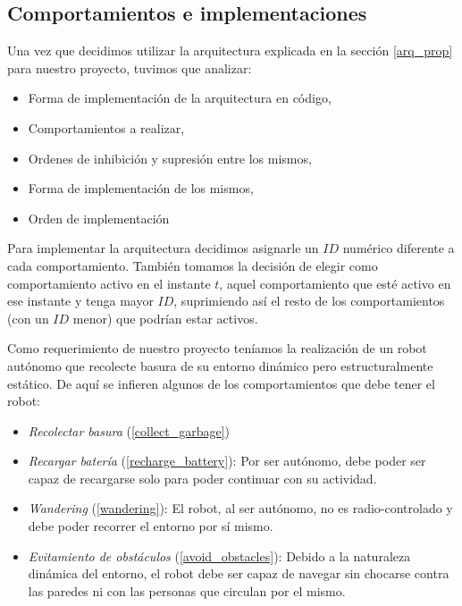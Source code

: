 
\subsection{Comportamientos e implementaciones}
\label{comportamientos}

Una vez que decidimos utilizar la arquitectura explicada en la secci\'on
\ref{arq_prop} para nuestro proyecto, tuvimos que analizar:
\begin{itemize}
\item{}Forma de implementaci\'on de la arquitectura en c\'odigo,
\item{}Comportamientos a realizar,
\item{}Ordenes de inhibici\'on y supresi\'on entre los mismos,
\item{}Forma de implementaci\'on de los mismos,
\item{}Orden de implementaci\'on
\end{itemize}

Para implementar la arquitectura decidimos asignarle un $ID$ num\'erico
diferente a cada comportamiento. Tambi\'en tomamos la decisi\'on de elegir como
comportamiento activo en el instante $t$, aquel comportamiento que est\'e
activo en ese instante y tenga mayor $ID$, suprimiendo as\'i el resto de los
comportamientos (con un $ID$ menor) que podr\'ian estar activos.

Como requerimiento de nuestro proyecto ten\'iamos la realizaci\'on de un robot
aut\'onomo que recolecte basura de su entorno din\'amico pero estructuralmente
est\'atico. De aqu\'i se infieren algunos de los comportamientos que debe tener
el robot:
\begin{itemize}
	\item{\emph{Recolectar basura} (\ref{collect_garbage})}
	\item{\emph{Recargar bater\'ia} (\ref{recharge_battery}):} Por ser
		aut\'onomo, debe poder ser capaz de recargarse solo para poder continuar
		con su actividad.
	\item{\emph{Wandering} (\ref{wandering}):} El robot, al ser aut\'onomo, no es
		radio-controlado y debe poder recorrer el entorno por s\'i mismo.
	\item{\emph{Evitamiento de obst\'aculos} (\ref{avoid_obstacles}):} Debido a
		la naturaleza din\'amica del entorno, el robot debe ser capaz de navegar
		sin chocarse contra las paredes ni con las personas que circulan por
		el mismo.
\end{itemize}

